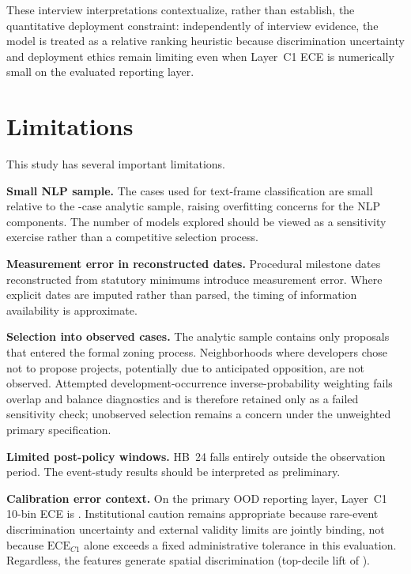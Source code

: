\documentclass[11pt, letterpaper]{article}
\begin{document}
These interview interpretations contextualize, rather than establish, the quantitative deployment constraint: independently of interview evidence, the model is treated as a relative ranking heuristic because discrimination uncertainty and deployment ethics remain limiting even when Layer~C1 ECE is numerically small on the evaluated reporting layer.

\section{Limitations}
\label{sec:limitations}

This study has several important limitations.

\textbf{Small NLP sample.} The \metricNLPCorpus{} cases used for text-frame classification are small relative to the \metricBaselineCases{}-case analytic sample, raising overfitting concerns for the NLP components. The number of models explored should be viewed as a sensitivity exercise rather than a competitive selection process.

\textbf{Measurement error in reconstructed dates.} Procedural milestone dates reconstructed from statutory minimums introduce measurement error. Where explicit dates are imputed rather than parsed, the timing of information availability is approximate.

\textbf{Selection into observed cases.} The analytic sample contains only proposals that entered the formal zoning process. Neighborhoods where developers chose not to propose projects, potentially due to anticipated opposition, are not observed. Attempted development-occurrence inverse-probability weighting fails overlap and balance diagnostics and is therefore retained only as a failed sensitivity check; unobserved selection remains a concern under the unweighted primary specification.

\textbf{Limited post-policy windows.} HB~24 falls entirely outside the observation period. The event-study results should be interpreted as preliminary.

\textbf{Calibration error context.} On the primary OOD reporting layer, Layer~C1 10-bin ECE is \metricECEOODBootstrapCalibrated{}. Institutional caution remains appropriate because rare-event discrimination uncertainty and external validity limits are jointly binding, not because $\text{ECE}_{C1}$ alone exceeds a fixed administrative tolerance in this evaluation. Regardless, the features generate spatial discrimination (top-decile lift of \metricTopDecileLift{}).
\end{document}
